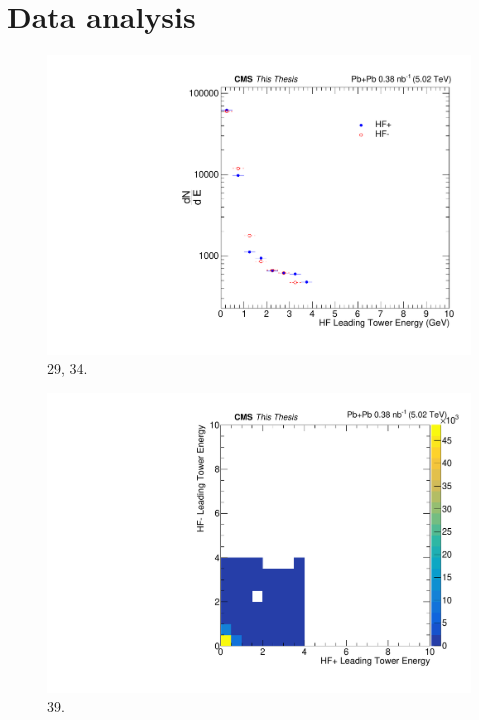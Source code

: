 
\chapter{Data analysis}

\begin{figure}[h!]
\begin{centering}
\includegraphics[width=5in]{Chapter6/importfigs/29_34_thesis.pdf}
\par\end{centering}
\caption{29, 34. \label{fig:29_34}}
\end{figure}


\begin{figure}[h!]
\begin{centering}
\includegraphics[width=5in]{Chapter6/importfigs/39_thesis.pdf}
\par\end{centering}
\caption{39. \label{fig:39}}
\end{figure}

